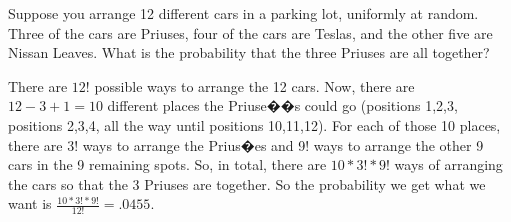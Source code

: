 \question Suppose you arrange 12 different cars in a parking lot, 
uniformly at random. Three of the cars are Priuses, four of the cars 
are Teslas, and the other five are Nissan Leaves. What is the 
probability that the three Priuses are all together? 

\begin{solution}
There are $12!$ possible ways to arrange the 12 cars. Now, there are 
$12 - 3+ 1 = 10$ different places the Priuse��s could go (positions 
1,2,3, positions 2,3,4, all the way until positions 10,11,12). 
For each of those 10 places, there are 3! ways to arrange the Prius�es 
and 9! ways to arrange the other 9 cars in the 9 remaining spots. 
So, in total, there are $10*3!*9!$ ways of arranging the cars so that 
the 3 Priuses are together. So the probability we get what we want is 
$\frac{10*3!*9!}{12! } = .0455$.
 \end{solution}